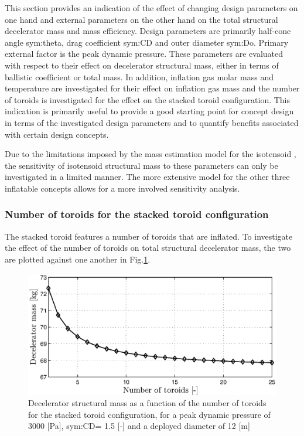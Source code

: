 This section provides an indication of the effect of changing design parameters on one hand and external parameters on the other hand on the total structural decelerator mass and mass efficiency. Design parameters are primarily half-cone angle \gls{sym:theta}, drag coefficient \gls{sym:CD} and outer diameter \gls{sym:Do}. Primary external factor is the peak dynamic pressure. These parameters are evaluated with respect to their effect on decelerator structural mass, either in terms of ballistic coefficient or total mass. In addition, inflation gas molar mass and temperature are investigated for their effect on inflation gas mass and the number of toroids is investigated for the effect on the stacked toroid configuration. This indication is primarily useful to provide a good starting point for concept design in terms of the investigated design parameters and to quantify benefits associated with certain design concepts. 

Due to the limitations imposed by the mass estimation model for the isotensoid \cite{Anderson1969}, the sensitivity of isotensoid structural mass to these parameters can only be investigated in a limited manner. The more extensive model for the other three inflatable concepts \cite{Samareh2011} allows for a more involved sensitivity analysis.


\subsubsection{Number of toroids for the stacked toroid configuration}
The stacked toroid features a number of toroids that are inflated. To investigate the effect of the number of toroids on total structural decelerator mass, the two are plotted against one another in Fig.\ref{fig:toro}. 

\begin{figure}[H]
\centering
\includegraphics[width = 1.0\textwidth]{Figure/mass_toroids.eps}
\caption{Decelerator structural mass as a function of the number of toroids for the stacked toroid configuration, for a peak dynamic pressure of 3000 [Pa], \gls{sym:CD}= 1.5 [-] and a deployed diameter of 12 [m]}
\label{fig:toro}
\end{figure}

